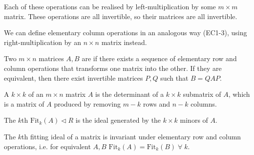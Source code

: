 \begin{remark}
	Each of these operations can be realised by left-multiplication by some $m \times m$ matrix.
	These operations are all invertible, so their matrices are all invertible.

	We can define elementary column operations in an analogous way (EC1-3), using right-multiplication by an $n \times n$ matrix instead.
\end{remark} 

\begin{definition}[Equivalent]
	Two $m \times n$ matrices $A, B$ are  if there exists a sequence of elementary row and column operations that transforms one matrix into the other.
	If they are equivalent, then there exist invertible matrices $P, Q$ such that $B = QAP$.
\end{definition}

\begin{definition}[Minor]
	A $k \times k$  of an $m \times n$ matrix $A$ is the determinant of a $k \times k$ submatrix of $A$, which is a matrix of $A$ produced by removing $m-k$ rows and $n-k$ columns.
\end{definition}

\begin{definition}
	The $k$th  $\mathrm{Fit}_k(A) \triangleleft R$ is the ideal generated by the $k \times k$ minors of $A$.
\end{definition} 

\begin{lemma} \label{eq:16.2}
	The $k$th fitting ideal of a matrix is invariant under elementary row and column operations, i.e. for equivalent $A, B$ $\mathrm{Fit}_k(A) = \mathrm{Fit}_k(B) \; \forall \; k$.
\end{lemma}

